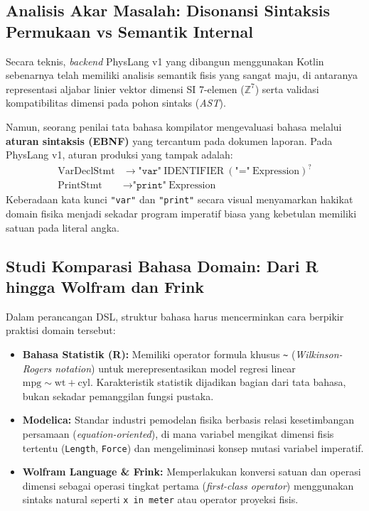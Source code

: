 \documentclass[11pt,a4paper]{article}
\begin{document}
\subsection{Analisis Akar Masalah: Disonansi Sintaksis Permukaan vs Semantik Internal}
Secara teknis, \textit{backend} PhysLang v1 yang dibangun menggunakan Kotlin sebenarnya telah memiliki analisis semantik fisis yang sangat maju, di antaranya representasi aljabar linier vektor dimensi SI 7-elemen ($\mathbb{Z}^7$) serta validasi kompatibilitas dimensi pada pohon sintaks (\textit{AST}).

Namun, seorang penilai tata bahasa kompilator mengevaluasi bahasa melalui \textbf{aturan sintaksis (EBNF)} yang tercantum pada dokumen laporan. Pada PhysLang v1, aturan produksi yang tampak adalah:
\begin{align*}
    \text{VarDeclStmt} &\to \texttt{"var"}\ \text{IDENTIFIER}\ ( \texttt{"="}\ \text{Expression} )^? \\
    \text{PrintStmt} &\to \texttt{"print"}\ \text{Expression}
\end{align*}
Keberadaan kata kunci \texttt{"var"} dan \texttt{"print"} secara visual menyamarkan hakikat domain fisika menjadi sekadar program imperatif biasa yang kebetulan memiliki satuan pada literal angka.

\subsection{Studi Komparasi Bahasa Domain: Dari R hingga Wolfram dan Frink}
Dalam perancangan DSL, struktur bahasa harus mencerminkan cara berpikir praktisi domain tersebut:
\begin{itemize}[noitemsep]
    \item \textbf{Bahasa Statistik (R):} Memiliki operator formula khusus \texttt{\textasciitilde} (\textit{Wilkinson-Rogers notation}) untuk merepresentasikan model regresi linear $\text{mpg} \sim \text{wt} + \text{cyl}$. Karakteristik statistik dijadikan bagian dari tata bahasa, bukan sekadar pemanggilan fungsi pustaka.
    \item \textbf{Modelica:} Standar industri pemodelan fisika berbasis relasi kesetimbangan persamaan (\textit{equation-oriented}), di mana variabel mengikat dimensi fisis tertentu (\texttt{Length}, \texttt{Force}) dan mengeliminasi konsep mutasi variabel imperatif.
    \item \textbf{Wolfram Language \& Frink:} Memperlakukan konversi satuan dan operasi dimensi sebagai operasi tingkat pertama (\textit{first-class operator}) menggunakan sintaks natural seperti \texttt{x in meter} atau operator proyeksi fisis.
\end{itemize}
\end{document}
